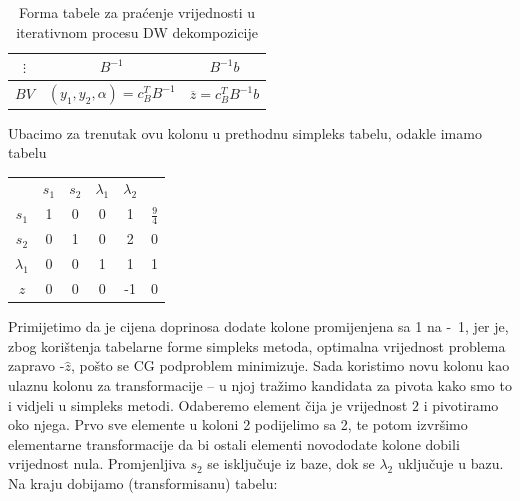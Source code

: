 \documentclass[a4paper, utf8, 11pt, colorlinks]{book}
\theoremstyle{definition}
\begin{document}
  \begin{table}\centering
 	\begin{tabular}{|c|c|c|} \hline
 		$\vdots$ & 	$B^{-1}$& $B^{-1}b$ \\
 		\hline
 		$BV$ &	$(y_1,y_2,\alpha)=c^T_B B^{-1}$ & $\overline{z}= c^T_B B^{-1}b$ \\	
 		\hline
 	\end{tabular}\caption{Forma tabele za praćenje vrijednosti u iterativnom procesu DW dekompozicije}\label{tbl:dw1}
 \end{table}
 
 

Ubacimo za trenutak ovu kolonu u prethodnu simpleks tabelu, odakle imamo tabelu

 \begin{center}
 	
 	\begin{tabular}{c|ccccc}
 	                &$s_1$        & $ s_2$   &  $\lambda_1$ & $\lambda_2$   &                \\
 		$s_1$	    &   1      &    0         &   0         &     1         &  $\frac{9}{4}$ \\
 		$s_2$	    &   0      &    1         &   0         &     2         &  0             \\
 		$\lambda_1$ &   0      &    0         &   1         &     1         &  1             \\ \hline
 		$z$         &   0      &    0         &   0         &    -1         &  0
 	\end{tabular}
 \end{center}
Primijetimo da je cijena doprinosa dodate kolone promijenjena sa 1 na -~1, jer je, zbog korištenja tabelarne forme simpleks metoda, optimalna vrijednost problema zapravo -$\hat{z}$, pošto se CG podproblem minimizuje. Sada koristimo novu kolonu kao ulaznu kolonu za transformacije -- u njoj tražimo kandidata za pivota kako smo to i vidjeli u simpleks metodi. Odaberemo element čija je vrijednost $2$ i pivotiramo oko njega. Prvo sve elemente u koloni 2 podijelimo sa 2, te potom izvršimo elementarne transformacije da bi ostali elementi novododate kolone dobili vrijednost nula. Promjenljiva $s_2$ se isključuje iz baze, dok se $\lambda_2$ uključuje u bazu. Na kraju dobijamo (transformisanu) tabelu:
\end{document}
